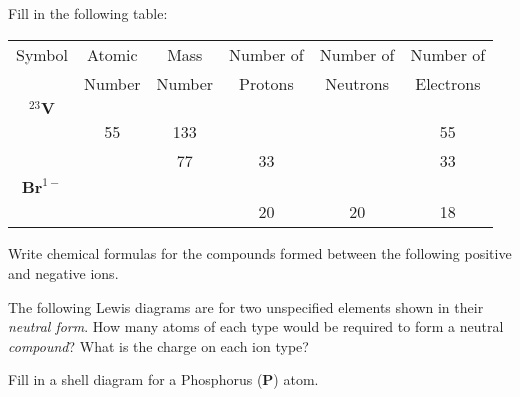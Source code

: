 \documentclass[addpoints, 12pt]{exam}
\begin{document}
\begin{questions}
\question[10]
Fill in the following table:

\begin{tabular}{| c | c | c | c | c | c |}
\hline
Symbol & Atomic & Mass & Number of&Number of&Number of \\
 & Number & Number & Protons & Neutrons & Electrons \\
\hline
$^{23}\textbf{V}$ & & & & & \\
\hline
 & 55 & 133 & & & 55\\
\hline
& & 77 & 33 & & 33\\ 
\hline
$\textbf{Br}^{1-}$ & & & & & \\
\hline
& & & 20 & 20 & 18 \\ 
\hline
\end{tabular}

\question[10]  Write chemical formulas for the compounds formed between the following positive and negative ions.


\question[10]
The following Lewis diagrams are for two unspecified elements shown in
their \emph{neutral form}.  How many atoms of each type would be
required to form a neutral \emph{compound}?  What is the charge on
each ion type? 



\question[10]  Fill in a shell diagram for a Phosphorus (\textbf{P}) atom.
  \begin{parts}

\end{parts}
\end{questions}
\end{document}
